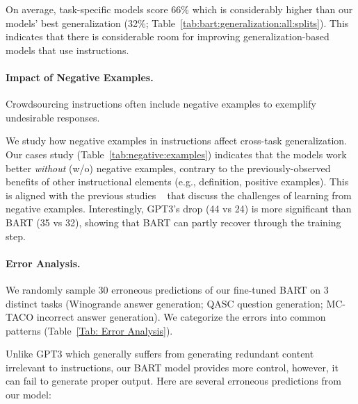 On average, task-specific models score 66\% which is considerably higher than our models' best generalization (32\%; Table~\ref{tab:bart:generalization:all:splits}).
This indicates that { there is considerable room for improving generalization-based models} that use instructions.

\paragraph{Impact of Negative Examples.} Crowdsourcing instructions often include negative examples to exemplify undesirable responses. 

We study how negative examples in instructions affect cross-task generalization. Our cases study (Table~\ref{tab:negative:examples}) indicates that the models work better \emph{without} (w/o) negative examples, contrary to the previously-observed benefits of other instructional elements (e.g., definition, positive examples). This is aligned with the previous studies ~\cite{xuan2020hard,lin2003bootstrapped} that discuss the challenges of learning from negative examples. Interestingly, GPT3's drop (44 vs 24) is more significant than BART (35 vs 32), showing that BART can partly recover through the training step. 

\paragraph{Error Analysis.}

We randomly sample 30 erroneous predictions of our fine-tuned BART on 3 distinct tasks (Winogrande answer generation; QASC question generation; MC-TACO incorrect answer generation). We categorize the errors into common patterns (Table~\ref{Tab: Error Analysis}).

Unlike GPT3 which generally suffers from generating redundant content irrelevant to instructions, our BART model provides more control, however, it can fail to generate proper output. Here are several erroneous predictions from our model: 

